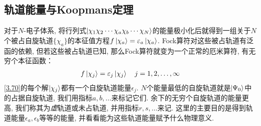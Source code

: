 \subsection{轨道能量与Koopmans定理}
对于$N$-电子体系, 
将行列式$\Ket{\chi_1\chi_2\cdots\chi_a\chi_b\cdots\chi_N}$的能量极小化后就得到一组关于$N$个被占自旋轨道$\{\chi_a\}$的本征值方程$f\Ket{\chi_a} = \varepsilon_a\Ket{\chi_a}$. 
Fock算符对这些被占轨道有泛函的依赖, 
但若这些被占轨道已知, 
那么Fock算符就变为一个正常的厄米算符, 
有无穷个本征函数：
\begin{align}
	\label{3.70}
	f\Ket{\chi_j} = \varepsilon_j\Ket{\chi_j}\quad j = 1,2,\ldots,\infty
\end{align}
\eqref{3.70}的每个解$\Ket{\chi_j}$都有一个自旋轨道能量$\epsilon_j$. $N$个能量最低的自旋轨道就是$\Ket{\Psi_0}$中的占据自旋轨道, 我们用指标$a,b,\ldots$来标记它们. 余下的无穷个自旋轨道的能量更高, 我们称其为\emph{虚}轨道或未占轨道, 并用指标$r,s,\ldots$来记. 这里的主要目的是得到轨道能量$\epsilon_a,\epsilon_b$等等的能量, 并看看能为这些轨道能量赋予什么物理意义.

